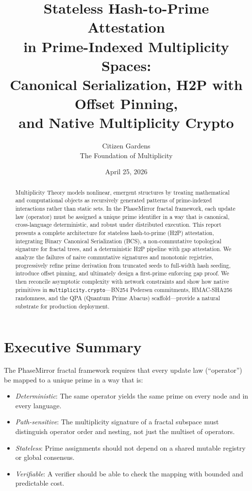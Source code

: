 \documentclass[11pt]{article}
\title{Stateless Hash-to-Prime Attestation \\ in Prime-Indexed Multiplicity Spaces:\\
Canonical Serialization, H2P with Offset Pinning, \\ and Native Multiplicity Crypto}
\author{%
  Citizen Gardens \\ The Foundation of Multiplicity
}
\date{April 25, 2026}
\begin{document}
\maketitle

\begin{abstract}
Multiplicity Theory models nonlinear, emergent structures by treating mathematical and computational objects as recursively generated patterns of prime-indexed interactions rather than static sets. In the PhaseMirror fractal framework, each update law (operator) must be assigned a unique prime identifier in a way that is canonical, cross-language deterministic, and robust under distributed execution. This report presents a complete architecture for stateless hash-to-prime (H2P) attestation, integrating Binary Canonical Serialization (BCS), a non-commutative topological signature for fractal trees, and a deterministic H2P pipeline with gap attestation. We analyze the failures of naive commutative signatures and monotonic registries, progressively refine prime derivation from truncated seeds to full-width hash seeding, introduce offset pinning, and ultimately design a first-prime enforcing gap proof. We then reconcile asymptotic complexity with network constraints and show how native primitives in \texttt{multiplicity.crypto}---BN254 Pedersen commitments, HMAC-SHA256 randomness, and the QPA (Quantum Prime Abacus) scaffold---provide a natural substrate for production deployment.
\end{abstract}
\newpage    
\tableofcontents
\newpage
\section{Executive Summary}

The PhaseMirror fractal framework requires that every update law (``operator'') be mapped to a unique prime in a way that is:

\begin{itemize}[leftmargin=*]
  \item \emph{Deterministic}: The same operator yields the same prime on every node and in every language.
  \item \emph{Path-sensitive}: The multiplicity signature of a fractal subspace must distinguish operator order and nesting, not just the multiset of operators.
  \item \emph{Stateless}: Prime assignments should not depend on a shared mutable registry or global consensus.
  \item \emph{Verifiable}: A verifier should be able to check the mapping with bounded and predictable cost.
\end{itemize}
\end{document}
